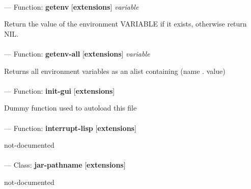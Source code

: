 \paragraph{}
\label{EXTENSIONS:GETENV}
--- Function: \textbf{getenv} [\textbf{extensions}] \textit{variable}

\begin{adjustwidth}{5em}{5em}
Return the value of the environment VARIABLE if it exists, otherwise return NIL.
\end{adjustwidth}

\paragraph{}
\label{EXTENSIONS:GETENV-ALL}
--- Function: \textbf{getenv-all} [\textbf{extensions}] \textit{variable}

\begin{adjustwidth}{5em}{5em}
Returns all environment variables as an alist containing (name . value)
\end{adjustwidth}

\paragraph{}
\label{EXTENSIONS:INIT-GUI}
--- Function: \textbf{init-gui} [\textbf{extensions}] \textit{}

\begin{adjustwidth}{5em}{5em}
Dummy function used to autoload this file
\end{adjustwidth}

\paragraph{}
\label{EXTENSIONS:INTERRUPT-LISP}
--- Function: \textbf{interrupt-lisp} [\textbf{extensions}] \textit{}

\begin{adjustwidth}{5em}{5em}
not-documented
\end{adjustwidth}

\paragraph{}
\label{EXTENSIONS:JAR-PATHNAME}
--- Class: \textbf{jar-pathname} [\textbf{extensions}] \textit{}

\begin{adjustwidth}{5em}{5em}
not-documented
\end{adjustwidth}

